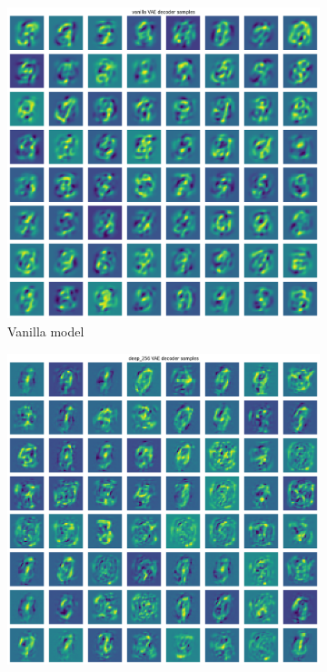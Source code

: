\documentclass[a4paper,11pt]{article}
\begin{document}
\begin{figure}[ht]
    \centering
    \begin{subfigure}[t]{0.35\textwidth}
        \includegraphics[width=\textwidth]{../images/64_decoder_vanilla.png}
        \caption{Vanilla model}
    \end{subfigure}
    \hfill
    \begin{subfigure}[t]{0.35\textwidth}
        \includegraphics[width=\textwidth]{../images/64_decoder_256.png}

\end{subfigure}
\end{figure}
\end{document}

